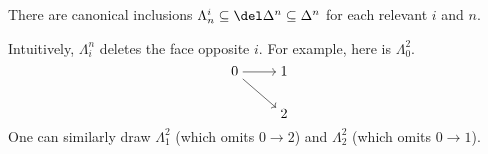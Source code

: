 \documentclass[../notes.tex]{subfiles}
\begin{document}
\begin{remark}
	There are canonical inclusions $\Lambda^i_n\subseteq\del\Delta^n\subseteq\Delta^n$ for each relevant $i$ and $n$.
\end{remark}
\begin{example}
	Intuitively, $\Lambda^n_i$ deletes the face opposite $i$. For example, here is $\Lambda_0^2$.
	\[\begin{tikzcd}[cramped]
		0 & 1 \\
		& 2
		\arrow[from=1-1, to=1-2]
		\arrow[from=1-1, to=2-2]
	\end{tikzcd}\]
	One can similarly draw $\Lambda^2_1$ (which omits $0\to2$) and $\Lambda^2_2$ (which omits $0\to1$).
\end{example}
\end{document}
